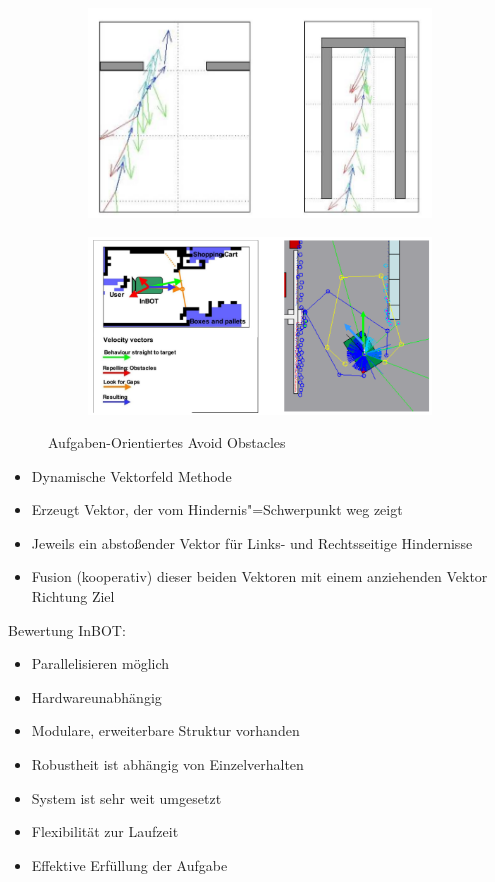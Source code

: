 \begin{figure}
	\centering
	\begin{subfigure}{.4\textwidth}
		\centering
		\includegraphics[width=\textwidth]{figures/objekt_level_hindernis.png}
	\end{subfigure}
	\begin{subfigure}{.4\textwidth}
		\centering
		\includegraphics[width=\textwidth]{figures/objekt_level_hindernis_1.png}
	\end{subfigure}
	\caption{Aufgaben-Orientiertes Avoid Obstacles}
	\label{ch:08:fig:objekt-orientiert-hindernis}
\end{figure}
\begin{itemize}
	\item Dynamische Vektorfeld Methode
	\item Erzeugt Vektor, der vom Hindernis"=Schwerpunkt weg zeigt
	\item Jeweils ein abstoßender Vektor für Links- und Rechtsseitige Hindernisse
	\item Fusion (kooperativ) dieser beiden Vektoren mit einem anziehenden Vektor Richtung Ziel
\end{itemize}

Bewertung InBOT:
\begin{itemize}
	\item Parallelisieren möglich
	\item Hardwareunabhängig
	\item Modulare, erweiterbare Struktur vorhanden
	\item Robustheit ist abhängig von Einzelverhalten
	\item System ist sehr weit umgesetzt
	\item Flexibilität zur Laufzeit
	\item Effektive Erfüllung der Aufgabe
\end{itemize}